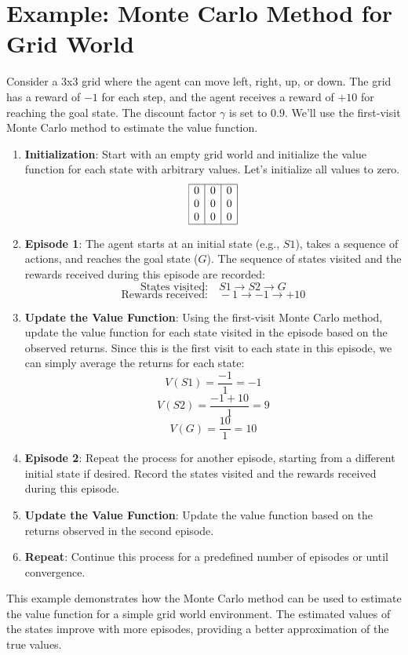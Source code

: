 \documentclass{article}
\begin{document}
\section*{Example: Monte Carlo Method for Grid World}

Consider a 3x3 grid where the agent can move left, right, up, or down. The grid has a reward of $-1$ for each step, and the agent receives a reward of $+10$ for reaching the goal state. The discount factor $\gamma$ is set to $0.9$. We'll use the first-visit Monte Carlo method to estimate the value function.

\begin{enumerate}
    \item \textbf{Initialization}: Start with an empty grid world and initialize the value function for each state with arbitrary values. Let's initialize all values to zero.
    \[
    \begin{array}{|c|c|c|}
    \hline
    0 & 0 & 0 \\
    0 & 0 & 0 \\
    0 & 0 & 0 \\
    \hline
    \end{array}
    \]

    \item \textbf{Episode 1}: The agent starts at an initial state (e.g., $S1$), takes a sequence of actions, and reaches the goal state ($G$). The sequence of states visited and the rewards received during this episode are recorded:
    \[
    \text{States visited:} \quad S1 \rightarrow S2 \rightarrow G
    \]
    \[
    \text{Rewards received:} \quad -1 \rightarrow -1 \rightarrow +10
    \]

    \item \textbf{Update the Value Function}: Using the first-visit Monte Carlo method, update the value function for each state visited in the episode based on the observed returns. Since this is the first visit to each state in this episode, we can simply average the returns for each state:
    \[
    V(S1) = \frac{-1}{1} = -1
    \]
    \[
    V(S2) = \frac{-1 + 10}{1} = 9
    \]
    \[
    V(G) = \frac{10}{1} = 10
    \]

    \item \textbf{Episode 2}: Repeat the process for another episode, starting from a different initial state if desired. Record the states visited and the rewards received during this episode.

    \item \textbf{Update the Value Function}: Update the value function based on the returns observed in the second episode.

    \item \textbf{Repeat}: Continue this process for a predefined number of episodes or until convergence.
\end{enumerate}

This example demonstrates how the Monte Carlo method can be used to estimate the value function for a simple grid world environment. The estimated values of the states improve with more episodes, providing a better approximation of the true values.
\end{document}
